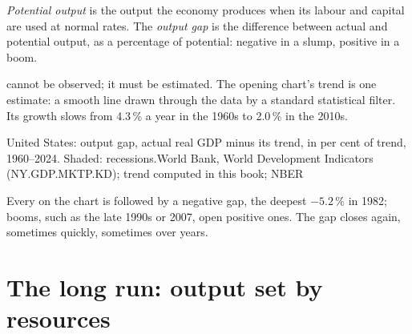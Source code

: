 \begin{definition}\label{def:g12:aggregate-demand-and-supply:potential-output}
\emph{Potential output} is the output the economy produces when its labour and capital are used at normal rates. The \emph{output gap}\label{def:g12:aggregate-demand-and-supply:output-gap} is the difference between actual and potential output, as a percentage of potential: negative
in a slump, positive in a boom.
\end{definition}

 cannot be observed; it must be estimated. The opening chart's trend is one estimate: a smooth line drawn through the data by a standard statistical
filter. Its growth slows from 4.3\,\% a year in the 1960s to 2.0\,\% in the 2010s.

\begin{omchart}{United States: output gap, actual real GDP minus its trend, in per cent of trend, 1960--2024. Shaded: recessions.}{World Bank, World Development Indicators
(NY.GDP.MKTP.KD); trend computed in this book; NBER}
\end{omchart}

Every  on the chart is followed by a negative gap, the deepest $-5.2\,\%$ in 1982; booms, such as the late 1990s or 2007, open positive ones. The gap
closes again, sometimes quickly, sometimes over years.

\section{The long run: output set by resources}\label{sec:g12:aggregate-demand-and-supply:long-run}

